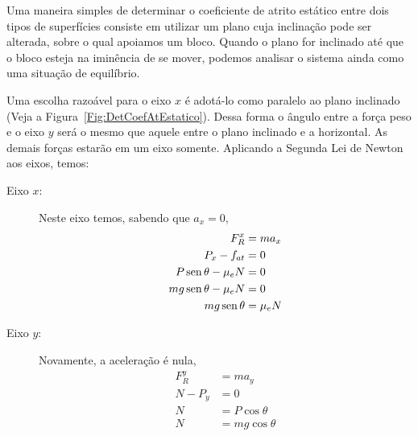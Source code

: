 Uma maneira simples de determinar o coeficiente de atrito estático entre dois tipos de superfícies consiste em utilizar um plano cuja inclinação pode ser alterada, sobre o qual apoiamos um bloco. Quando o plano for inclinado até que o bloco esteja na iminência de se mover, podemos analisar o sistema ainda como uma situação de equilíbrio.

Uma escolha razoável para o eixo $x$ é adotá-lo como paralelo ao plano inclinado (Veja a Figura~\ref{Fig:DetCoefAtEstatico}). Dessa forma o ângulo entre a força peso e o eixo $y$ será o mesmo que aquele entre o plano inclinado e a horizontal. As demais forças estarão em um eixo somente. Aplicando a Segunda Lei de Newton aos eixos, temos:
\begin{description}
    \item[Eixo $x$:] Neste eixo temos, sabendo que $a_x = 0$,
        \begin{align}
            F_R^x &= m a_x \\
            P_x - f_{at} &= 0 \\
            P \operatorname{sen}\theta - \mu_e N &= 0 \\
            mg \operatorname{sen}\theta - \mu_e N &= 0 \\
            mg \operatorname{sen}\theta &= \mu_e N \label{coef_atrito_deduc}
        \end{align}
    \item[Eixo $y$:] Novamente, a aceleração é nula,
        \begin{align}
            F_R^y &= m a_y \\
            N - P_y &= 0 \\
            N &= P\cos\theta \\
            N &= mg \cos\theta
        \end{align}
\end{description}
